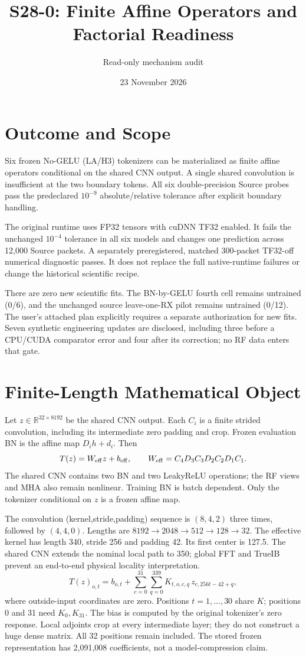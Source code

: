 \documentclass[10pt]{article}
\title{S28-0: Finite Affine Operators and Factorial Readiness}
\author{Read-only mechanism audit}\date{23 November 2026}
\begin{document}
\maketitle
\section{Outcome and Scope}
Six frozen No-GELU (LA/H3) tokenizers can be materialized as finite affine operators conditional on the shared CNN output. A single shared convolution is insufficient at the two boundary tokens. All six double-precision Source probes pass the predeclared $10^{-9}$ absolute/relative tolerance after explicit boundary handling.

The original runtime uses FP32 tensors with cuDNN TF32 enabled. It fails the unchanged $10^{-4}$ tolerance in all six models and changes one prediction across 12,000 Source packets. A separately preregistered, matched 300-packet TF32-off numerical diagnostic passes. It does not replace the full native-runtime failures or change the historical scientific recipe.

There are zero new scientific fits. The BN-by-GELU fourth cell remains untrained (0/6), and the unchanged source leave-one-RX pilot remains untrained (0/12). The user's attached plan explicitly requires a separate authorization for new fits. Seven synthetic engineering updates are disclosed, including three before a CPU/CUDA comparator error and four after its correction; no RF data enters that gate.
\section{Finite-Length Mathematical Object}
Let $z\in\mathbb R^{32\times8192}$ be the shared CNN output. Each $C_i$ is a finite strided convolution, including its intermediate zero padding and crop. Frozen evaluation BN is the affine map $D_i h+d_i$. Then
\[
T(z)=W_{\rm eff}z+b_{\rm eff},\qquad
W_{\rm eff}=C_4D_3C_3D_2C_2D_1C_1.
\]
The shared CNN contains two BN and two LeakyReLU operations; the RF views and MHA also remain nonlinear. Training BN is batch dependent. Only the tokenizer conditional on $z$ is a frozen affine map.

The convolution (kernel,stride,padding) sequence is $(8,4,2)$ three times, followed by $(4,4,0)$. Lengths are $8192\to2048\to512\to128\to32$. The effective kernel has length 340, stride 256 and padding 42. Its first center is 127.5. The shared CNN extends the nominal local path to 350; global FFT and TrueIB prevent an end-to-end physical locality interpretation.
\[
T(z)_{o,t}=b_{o,t}+\sum_{c=0}^{31}\sum_{q=0}^{339}
K_{t,o,c,q}\,z_{c,256t-42+q},
\]
where outside-input coordinates are zero. Positions $t=1,\ldots,30$ share $K$; positions 0 and 31 need $K_0,K_{31}$. The bias is computed by the original tokenizer's zero response. Local adjoints crop at every intermediate layer; they do not construct a huge dense matrix. All 32 positions remain included. The stored frozen representation has 2,091,008 coefficients, not a model-compression claim.
\clearpage
\end{document}
